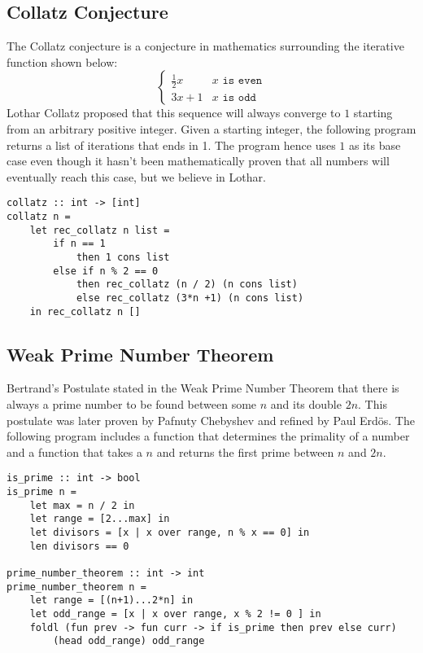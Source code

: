 ﻿\documentclass[5pt]{article}
\begin{document}
\subsection{Collatz Conjecture}
The Collatz conjecture is a conjecture in mathematics surrounding the iterative 
function shown below:
$$ \begin{cases} 
      \frac{1}{2}x & x \texttt{ is even} \\
      3x + 1 & x \texttt{ is odd} 
   \end{cases}
$$
Lothar Collatz proposed that this sequence will always converge to $1$ starting 
from an arbitrary positive integer. Given a starting integer, the following 
program returns a list of iterations that ends in 1. The program hence uses $1$ 
as its base case even though it hasn't been mathematically proven that all 
numbers will eventually reach this case, but we believe in Lothar.
\begin{lstlisting}[language=rippl]
collatz :: int -> [int]
collatz n =
    let rec_collatz n list =
        if n == 1
            then 1 cons list
        else if n % 2 == 0
            then rec_collatz (n / 2) (n cons list)
            else rec_collatz (3*n +1) (n cons list)
    in rec_collatz n []
\end{lstlisting}
\subsection{Weak Prime Number Theorem}
Bertrand's Postulate stated in the Weak Prime Number Theorem that there is 
always a prime number to be found between some $n$ and its double $2n$. This 
postulate was later proven by Pafnuty Chebyshev and refined by Paul Erd\"{o}s. 
The following program includes a function that determines the primality of a 
number and a function that takes a $n$ and returns the first prime between 
$n$ and $2n$.
\begin{lstlisting}[language=rippl]
is_prime :: int -> bool
is_prime n =
    let max = n / 2 in
    let range = [2...max] in
    let divisors = [x | x over range, n % x == 0] in
    len divisors == 0
    
prime_number_theorem :: int -> int
prime_number_theorem n =
    let range = [(n+1)...2*n] in
    let odd_range = [x | x over range, x % 2 != 0 ] in
    foldl (fun prev -> fun curr -> if is_prime then prev else curr)
        (head odd_range) odd_range
\end{lstlisting}
\end{document}
